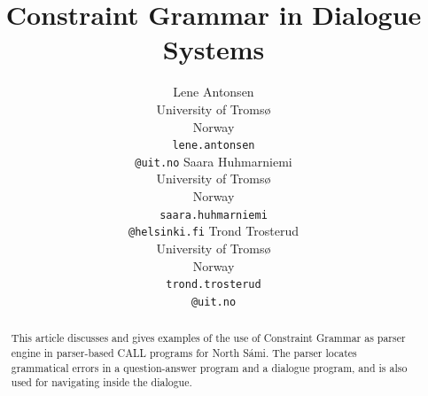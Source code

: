 \documentclass[11pt]{article}
\begin{document}
\title{Constraint Grammar in Dialogue Systems}

\author{Lene Antonsen\\
  University of Tromsø\\
  Norway\\
  {\tt lene.antonsen}\\{\tt @uit.no}  \And
  Saara Huhmarniemi\\
  University of Tromsø\\
  Norway\\
  {\tt saara.huhmarniemi}\\{\tt @helsinki.fi}  \And
  Trond Trosterud\\
  University of Tromsø\\
  Norway\\
  {\tt trond.trosterud}\\{\tt @uit.no}}



\maketitle
{}


 
\maketitle

\begin{abstract}
This article discusses and gives examples of the use of Constraint Grammar as parser engine in parser-based CALL programs for North Sámi. The parser locates grammatical errors in a question-answer program and a dialogue program, and is also used for navigating inside the dialogue.

\end{abstract}
\end{document}
